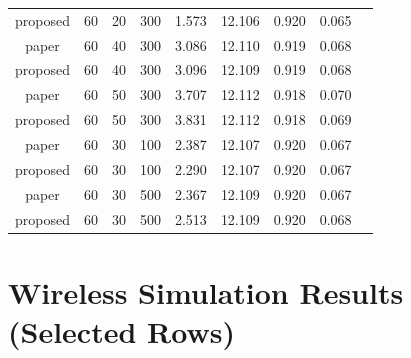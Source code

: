 \documentclass[12pt,a4paper]{report}
\begin{document}
\begin{longtable}{ccccccccc}
  proposed & 60 & 20 & 300 & 1.573   & 12.106 & 0.920 & 0.065 \\
  paper    & 60 & 40 & 300 & 3.086   & 12.110 & 0.919 & 0.068 \\
  proposed & 60 & 40 & 300 & 3.096   & 12.109 & 0.919 & 0.068 \\
  paper    & 60 & 50 & 300 & 3.707   & 12.112 & 0.918 & 0.070 \\
  proposed & 60 & 50 & 300 & 3.831   & 12.112 & 0.918 & 0.069 \\
  paper    & 60 & 30 & 100 & 2.387   & 12.107 & 0.920 & 0.067 \\
  proposed & 60 & 30 & 100 & 2.290   & 12.107 & 0.920 & 0.067 \\
  paper    & 60 & 30 & 500 & 2.367   & 12.109 & 0.920 & 0.067 \\
  proposed & 60 & 30 & 500 & 2.513   & 12.109 & 0.920 & 0.068 \\
\end{longtable}

\section{Wireless Simulation Results (Selected Rows)}
\end{document}
